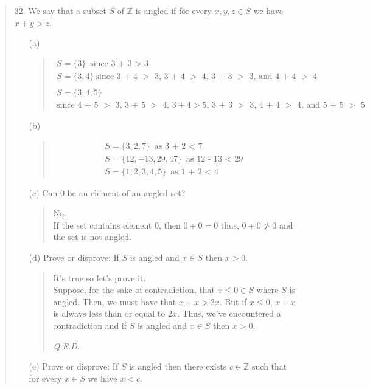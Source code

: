 \documentclass[12pt, a4paper]{article}                      %
\begin{document}
\begin{enumerate}
\begin{quote}
\item[32.]
We say that a subset $S$ of $\mathbb{Z}$ is angled if for every $x, y, z \in S$ we have $x + y > z$.
\begin{itemize}
\item[(a)]
\begin{quote}
\begin{gather*}
S = \{3\} \ \mbox{since 3 + 3 $>$ 3}\\
S = \{3, 4\} \ \mbox{since 3 + 4 $>$ 3, 3 + 4 $>$ 4, 3 + 3 $>$ 3, and 4 + 4 $>$ 4}\\\\
S = \{3, 4, 5\}\\
\mbox{since 4 + 5 $>$ 3, 3 + 5 $>$ 4, $3 + 4 > 5$, 3 + 3 $>$ 3, 4 + 4 $>$ 4, and 5 + 5 $>$ 5}
\end{gather*}
\end{quote}
\item[(b)]
\begin{quote}
\begin{gather*}
S = \{3, 2, 7\} \ \mbox{as 3 + 2 $<$ 7}\\
S = \{12, -13, 29, 47\} \ \mbox{as 12 - 13 $<$ 29}\\
S = \{1, 2, 3, 4, 5\} \ \mbox{as 1 + 2 $<$ 4}
\end{gather*}
\end{quote}
\item[(c)]
Can 0 be an element of an angled set?
\begin{quote}
No.\\
If the set contains element 0, then $0 + 0 = 0$ thus, $0 + 0 \not> 0$
and the set is not angled.
\end{quote}
\item[(d)]
Prove or disprove: If $S$ is angled and $x \in S$ then $x > 0$.
\begin{quote}
It's true so let's prove it.\\
Suppose, for the sake of contradiction, that $x \leq 0 \in S$ where $S$ is angled.
Then, we must have that $x + x > 2x$. But if $x \leq 0$, $x + x$ is always less than or equal to $2x$.
Thus, we've encountered a contradiction and if $S$ is angled and $x \in S$ then $x > 0$.
\begin{flushright}
\textit{Q.E.D.}
\end{flushright}
\end{quote}
\item[(e)]
Prove or disprove: If $S$ is angled then there exists $c \in \mathbb{Z}$ such that for every $x \in S$
we have $x < c$.
\begin{quote}

\end{quote}
\end{itemize}
\end{quote}
\end{enumerate}
\end{document}
